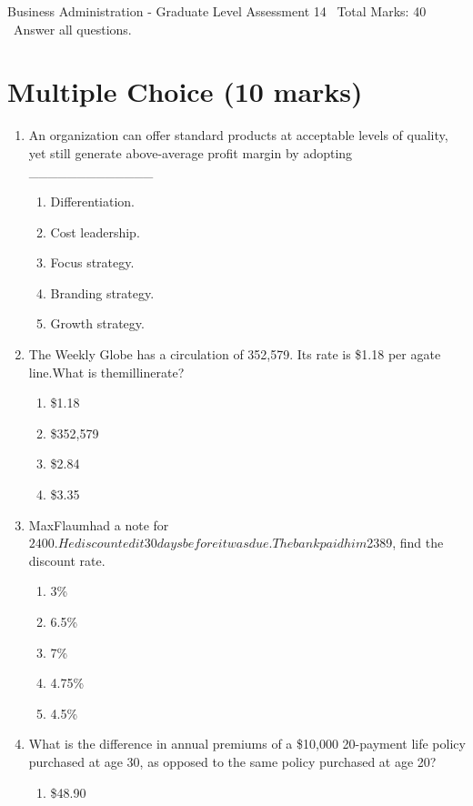\documentclass[12pt]{article}
\begin{document}
\begin{center}
Business Administration - Graduate Level Assessment 14 \
Total Marks: 40 \
Answer all questions.
\end{center}

\section*{Multiple Choice (10 marks)}
\begin{enumerate}[label=\arabic*.]
\item An organization can offer standard products at acceptable levels of quality, yet still generate above-average profit margin by adopting \_\_\_\_\_\_\_\_\_\_\_\_\_
\begin{enumerate}[label=(\alph*)]
    \item Differentiation.
    \item Cost leadership.
    \item Focus strategy.
    \item Branding strategy.
    \item Growth strategy.
\end{enumerate}
\item The Weekly Globe has a circulation of 352,579. Its rate is \$1.18 per agate line.What is themillinerate?
\begin{enumerate}[label=(\alph*)]
    \item \$1.18
    \item \$352,579
    \item \$2.84
    \item \$3.35
\end{enumerate}
\item MaxFlaumhad a note for $2400. He discounted it 30 days before it was due. The bank paid him $2389, find the discount rate.
\begin{enumerate}[label=(\alph*)]
    \item 3\%
    \item 6.5\%
    \item 7\%
    \item 4.75\%
    \item 4.5\%
\end{enumerate}
\item What is the difference in annual premiums of a \$10,000 20-payment life policy purchased at age 30, as opposed to the same policy purchased at age 20?
\begin{enumerate}[label=(\alph*)]
    \item \$48.90

\end{enumerate}
\end{enumerate}
\end{document}
